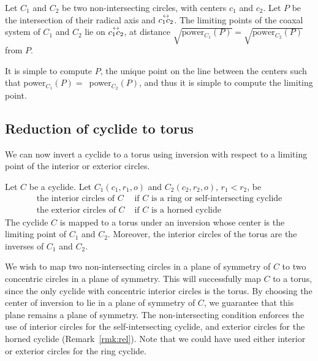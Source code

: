 \begin{lemma}
\cite{J29} %
\label{lem:sqrtp}
Let $C_1$ and $C_2$ be two non-intersecting circles, with centers $c_1$
and $c_2$.
Let $P$ be the intersection of their radical axis and $\mbox{$\stackrel{\leftrightarrow}{c_1c_2}$}$.
The limiting points of the coaxal system of $C_1$ and $C_2$
lie on $\mbox{$\stackrel{\leftrightarrow}{c_1c_2}$}$, at distance $\sqrt{\mbox{power$_{C_1}(P)$}} = 
\sqrt{\mbox{power$_{C_2}(P)$}}$ from $P$.
\end{lemma}


It is simple to compute $P$, the unique point on the line between the centers
such that \mbox{power$_{C_1}(P) =$ power$_{C_2}(P)$}, 
and thus it is simple to compute the limiting point.

\subsection{Reduction of cyclide to torus}

We can now invert a cyclide to a torus using 
inversion with respect to a limiting point of the interior or exterior circles.

\begin{theorem}
\label{cor:coi}
Let $C$ be a cyclide.
Let $C_1(c_1,r_1,o)$ and $C_2(c_2,r_2,o)$, $r_1 < r_2$, be 
\[
\begin{array}{ll}
\mbox{the interior circles of $C$} & \mbox{\ \ \ \ if $C$ is a ring or 
			self-intersecting cyclide} \\
\mbox{the exterior circles of $C$} & \mbox{\ \ \ \ if $C$ is a horned cyclide}
\end{array} 
\]
The cyclide $C$ is mapped to a torus under an inversion 
whose center is the limiting point of $C_1$ and $C_2$.
Moreover, the interior circles of the torus are the inverses of $C_1$ 
and $C_2$.
\end{theorem}
\prf
We wish to map two non-intersecting circles in a plane of symmetry of $C$
to two concentric circles in a plane of symmetry.
This will successfully map $C$ to a torus, since the only cyclide with 
concentric interior circles is the torus.
By choosing the center of inversion to lie in a plane of symmetry of $C$,
we guarantee that this plane remains a plane of symmetry.
The non-intersecting condition enforces the use of interior circles
for the self-intersecting cyclide, and exterior circles for the horned
cyclide (Remark~\ref{rmk:rel}).
Note that we could have used either interior or exterior circles for the ring
cyclide.
\QED

